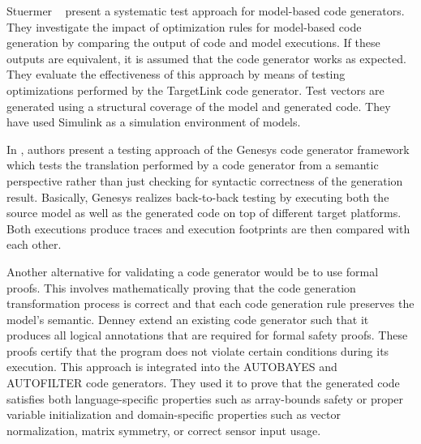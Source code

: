 Stuermer \etal~\cite{stuermer2007systematic} present a systematic test approach for model-based code generators. They investigate the impact of optimization rules for model-based code generation by comparing the output of code and model executions.
If these outputs are equivalent, it is assumed that the code generator works as expected. 
They evaluate the effectiveness of this approach by means of testing optimizations performed by the TargetLink code generator. Test vectors are generated using a structural coverage of the model and generated code.
They have used Simulink as a simulation environment of models. 

In \cite{jorges2014back}, authors present a testing approach of the Genesys code generator framework which tests the translation performed by a code generator from a semantic perspective rather than just checking for syntactic correctness of the generation result. Basically,
Genesys realizes back-to-back testing by executing both the source model as well as the generated code on top of different target platforms. Both executions produce traces and execution footprints are then compared with each other.

Another alternative for validating a code generator would be to use formal proofs\cite{basir2008constructing}. This involves mathematically proving that the code generation transformation process is correct and that each code generation rule preserves the model's semantic. 
Denney \etal\cite{denney2005certifiable} extend an existing code generator such that it produces all logical annotations that are required for formal safety proofs. These proofs certify that the program does not violate certain conditions during its execution. This approach is integrated into the AUTOBAYES and
AUTOFILTER code generators. They used it to prove that the generated code satisfies both language-specific properties such as array-bounds safety or proper variable initialization and domain-specific properties such as vector normalization, matrix symmetry, or correct sensor input usage.


